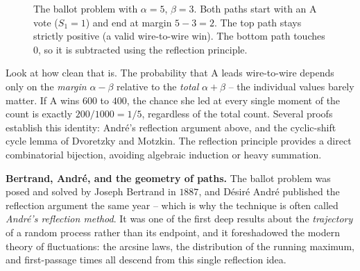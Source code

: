 \begin{example}
\begin{figure}[H]
\centering
{}
\caption{The ballot problem with $\alpha=5$, $\beta=3$. Both paths start with an A vote ($S_1=1$) and end at margin $5-3=2$. The top path stays strictly positive (a valid wire-to-wire win). The bottom path touches $0$, so it is subtracted using the reflection principle.}
\label{ch26:fig-ballot}
\end{figure}
\end{example}

\begin{aestheticbox}
Look at how clean that is. The probability that A leads wire-to-wire depends
only on the \emph{margin} $\alpha - \beta$ relative to the \emph{total}
$\alpha + \beta$ -- the individual values barely matter. If A wins $600$ to
$400$, the chance she led at every single moment of the count is exactly
$200/1000 = 1/5$, regardless of the total count. Several proofs establish this
identity: Andr\'e's reflection argument above, and the cyclic-shift cycle lemma of
Dvoretzky and Motzkin. The reflection principle provides a direct combinatorial bijection,
avoiding algebraic induction or heavy summation.
\end{aestheticbox}

\begin{connectionbox}
\textbf{Bertrand, Andr\'e, and the geometry of paths.} The ballot problem was
posed and solved by Joseph Bertrand in $1887$, and D\'esir\'e Andr\'e published
the reflection argument the same year -- which is why the technique is often
called \emph{Andr\'e's reflection method}. It was one of the first deep
results about the \emph{trajectory} of a random process rather than its
endpoint, and it foreshadowed the modern theory of fluctuations: the arcsine
laws, the distribution of the running maximum, and first-passage times all
descend from this single reflection idea.
\end{connectionbox}

